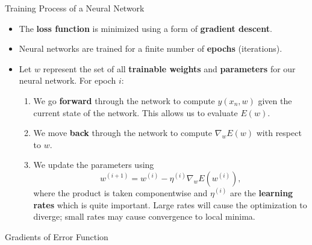 \documentclass[10pt, hyperref={colorlinks = true,linkcolor = blue}]{beamer}
\begin{document}
{{{\begin{frame}{Training Process of a Neural Network}
\begin{itemize}
        \item The \textbf{loss function} is minimized using a form of \textbf{gradient descent}.
        \item Neural networks are trained for a finite number of \textbf{epochs} (iterations).
        \item Let \( w \) represent the set of all \textbf{trainable weights} and \textbf{parameters} for our neural network. For epoch \( i \):
        \begin{enumerate}
            \item We go \textbf{forward} through the network to compute \( y(x_n, w) \) given the current state of the network. This allows us to evaluate \( E(w) \).
            \item We move \textbf{back} through the network to compute \( \nabla_{w} E(w) \) with respect to \(w\).
            \item We update the parameters using
            \[
            w^{(i+1)} = w^{(i)} - \eta^{(i)} \nabla_{w} E(w^{(i)}),
            \]
            where the product is taken componentwise and \( \eta^{(i)} \) are the \textbf{learning rates} which is quite important. Large rates will cause the
optimization to diverge; small rates may cause convergence to local minima.
        \end{enumerate}
    \end{itemize}
\end{frame}



\begin{frame}{Gradients of Error Function}


\end{frame}}}}
\end{document}
